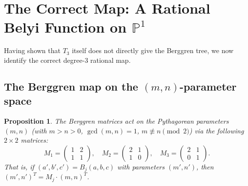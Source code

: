 \documentclass[12pt]{amsart}
\newtheorem{proposition}[theorem]{Proposition}
\theoremstyle{definition}
\theoremstyle{remark}
\newcommand{\PP}{\mathbb{P}}
\renewcommand{\gcd}{\operatorname{gcd}}
\begin{document}
\section{The Correct Map: A Rational Belyi Function on $\PP^1$}\label{sec:correct}

Having shown that $T_3$ itself does not directly give the Berggren tree,
we now identify the correct degree-3 rational map.

\subsection{The Berggren map on the $(m,n)$-parameter space}

\begin{proposition}\label{prop:mn-action}
The Berggren matrices act on the Pythagorean parameters $(m,n)$
(with $m>n>0$, $\gcd(m,n)=1$, $m\not\equiv n\pmod{2}$) via the
following $2\times 2$ matrices:
\begin{equation}\label{eq:berggren-mn}
  M_1 = \begin{pmatrix}1&2\\1&1\end{pmatrix},\quad
  M_2 = \begin{pmatrix}2&1\\1&0\end{pmatrix},\quad
  M_3 = \begin{pmatrix}2&1\\0&1\end{pmatrix}.
\end{equation}
That is, if $(a',b',c') = B_j(a,b,c)$ with parameters $(m',n')$,
then $(m',n')^T = M_j\cdot(m,n)^T$.
\end{proposition}
\end{document}
